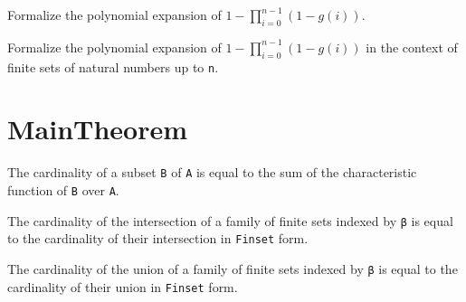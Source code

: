 \begin{lemma}\label{mul_expand₂}
  Formalize the polynomial expansion of \(1 - \prod_{i=0}^{n-1} (1 - g(i))\).
\end{lemma}

\begin{lemma}\label{mul_expand₁}
  Formalize the polynomial expansion of \(1 - \prod_{i=0}^{n-1} (1 - g(i))\) in the context of finite sets of natural numbers up to \verb|n|.
\end{lemma}


\section{MainTheorem}

\begin{lemma}\label{card_eq_sum_char_fun}
  The cardinality of a subset \verb|B| of \verb|A| is equal to the sum of the characteristic function of \verb|B| over \verb|A|.
\end{lemma}

\begin{lemma}\label{card_eq_FinInter}
  The cardinality of the intersection of a family of finite sets indexed by \verb|β| is equal to the cardinality of their intersection in \verb|Finset| form.
\end{lemma}

\begin{lemma}\label{card_eq_FinUnion}
  The cardinality of the union of a family of finite sets indexed by \verb|β| is equal to the cardinality of their union in \verb|Finset| form.
\end{lemma}

